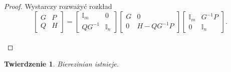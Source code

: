 \documentclass[11pt,a4paper]{report}
\newtheorem{theorem}{Twierdzenie}[section]
\theoremstyle{definition}
\newcommand{\I}{\mathbb{I}}
\begin{document}
\begin{proof}
Wystarczy rozważyć rozkład
\begin{equation*}
 \begin{bmatrix}
      G & P \\
      Q & H
     \end{bmatrix}
     =
     \begin{bmatrix}
      \I_m & 0 \\
      QG^{-1} & \I_n
     \end{bmatrix}
     \begin{bmatrix}
      G & 0 \\
      0 & H-QG^{-1}P
     \end{bmatrix}
     \begin{bmatrix}
      \I_m & G^{-1}P \\
      0 & \I_n
     \end{bmatrix}\!\!.
\end{equation*} \\[-24pt]
\end{proof}
\begin{theorem}
Bierezinian istnieje.
\end{theorem}
\end{document}
